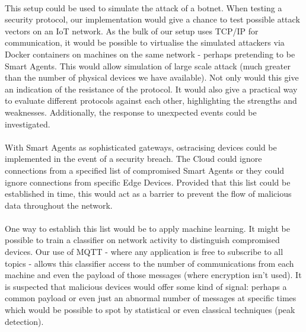 \paragraph{}
This setup could be used to simulate the attack of a botnet. When testing a security protocol, our implementation would give a chance to test possible attack vectors on an IoT network. As the bulk of our setup uses TCP/IP for communication, it would be possible to virtualise the simulated attackers via Docker containers on machines on the same network - perhaps pretending to be Smart Agents. This would allow simulation of large scale attack (much greater than the number of physical devices we have available). Not only would this give an indication of the resistance of the protocol. It would also give a practical way to evaluate different protocols against each other, highlighting the strengths and weaknesses. Additionally, the response to unexpected events could be investigated.

\paragraph{}
With Smart Agents as sophisticated gateways, ostracising devices could be implemented in the event of a security breach. The Cloud could ignore connections from a specified list of compromised Smart Agents or they could ignore connections from specific Edge Devices. Provided that this list could be established in time, this would act as a barrier to prevent the flow of malicious data throughout the network.

\paragraph{}
One way to establish this list would be to apply machine learning. It might be possible to train a classifier on network activity to distinguish compromised devices. Our use of MQTT - where any application is free to subscribe to all topics - allows this classifier access to the number of communications from each machine and even the payload of those messages (where encryption isn't used). It is suspected that malicious devices would offer some kind of signal: perhaps a common payload or even just an abnormal number of messages at specific times which would be possible to spot by statistical or even classical techniques (peak detection).
